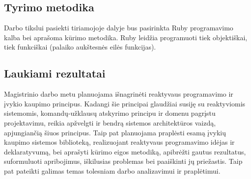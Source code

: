 \subsection{Tyrimo metodika}

    Darbo tikslui pasiekti tiriamojoje dalyje bus pasirinkta Ruby programavimo kalba bei aprašoma kūrimo metodika. Ruby leidžia programuoti tiek objektiškai, tiek funkciškai (palaiko aukštesnės eilės funkcijas).

\subsection{Laukiami rezultatai}

    Magistrinio darbo metu planuojama išnagrinėti reaktyvaus programavimo ir įvykio kaupimo principus. Kadangi šie principai glaudžiai susiję su reaktyviomis sistemomis, komandų-užklausų atskyrimo principu ir domenu pagrįstu projektavimu, reikia apžvelgti ir bendrą sistemos architektūros vaizdą, apjungiančią šiuos principus. Taip pat planuojama praplėsti esamą įvykių kaupimo sistemos biblioteką, realizuojant reaktyvaus programavimo idėjas ir deklaratyvumą, bei aprašyti kūrimo eigos metodiką, apibrėžti gautus rezultatus, suformuluoti apribojimus, iškilusias problemas bei paaiškinti jų priežastis. Taip pat pateikti galimas temas tolesniam darbo analizavimui ir praplėtimui.
